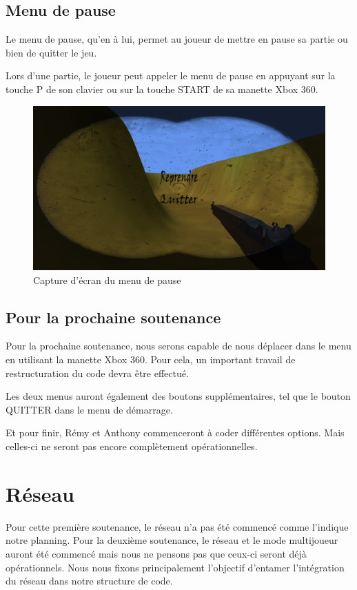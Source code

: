 \documentclass[11pt]{report}
\begin{document}
\subsection{Menu de pause}

Le menu de pause, qu'en à lui, permet au joueur de mettre en pause sa partie ou bien de quitter le jeu.

Lors d'une partie, le joueur peut appeler le menu de pause en appuyant sur la touche P de son clavier ou sur la touche START de sa manette Xbox 360.

\begin{figure}[htbp]
\centering
\includegraphics[scale=0.13]{menu-pause.png}
\caption{Capture d'écran du menu de pause}
\end{figure}

\subsection{Pour la prochaine soutenance}

Pour la prochaine soutenance, nous serons capable de nous déplacer dans le menu en utilisant la manette Xbox 360. Pour cela, un important travail de restructuration du code devra être effectué.

Les deux menus auront également des boutons supplémentaires, tel que le bouton QUITTER dans le menu de démarrage.

Et pour finir, Rémy et Anthony commenceront à coder différentes options. Mais celles-ci ne seront pas encore complètement opérationnelles.

\newpage
\section{Réseau}

Pour cette première soutenance, le réseau n'a pas été commencé comme l'indique notre planning. Pour la deuxième soutenance, le réseau et le mode multijoueur auront été commencé mais nous ne pensons pas que ceux-ci seront déjà opérationnels. Nous nous fixons principalement l'objectif d'entamer l'intégration du réseau dans notre structure de code.
\end{document}
